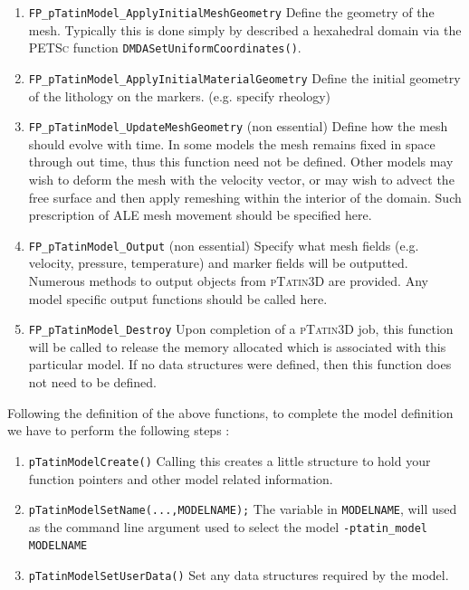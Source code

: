 \documentclass[paper=a4, fontsize=11pt,twoside]{scrartcl}
\newcommand{\ptat}{{{\textsc{pTatin3D}}}}
\newcommand{\PETSc}{{{\textsc{PETSc}}}}
\newcommand{\unix}[1]{\texttt{\footnotesize #1}}
\begin{document}
{{\begin{enumerate}
	\item \unix{FP\_pTatinModel\_ApplyInitialMeshGeometry}
	Define the geometry of the mesh. Typically this is done simply by described a hexahedral domain via the {\PETSc} function \unix{DMDASetUniformCoordinates()}.

	\item \unix{FP\_pTatinModel\_ApplyInitialMaterialGeometry}
	Define the initial geometry of the lithology on the markers. (e.g. specify rheology)

	\item \unix{FP\_pTatinModel\_UpdateMeshGeometry} (non essential)
	Define how the mesh should evolve with time. In some models the mesh remains fixed in space through out time, thus this function need not be defined. Other models may wish to deform the mesh with the velocity vector, or may wish to advect the free surface and then apply remeshing within the interior of the domain. Such prescription of ALE mesh movement should be specified here.

	\item \unix{FP\_pTatinModel\_Output} (non essential)
	Specify what mesh fields (e.g. velocity, pressure, temperature) and marker fields will be outputted. Numerous
	methods to output objects from {\ptat} are provided. Any model specific output functions should be called here.

	\item \unix{FP\_pTatinModel\_Destroy} 
	Upon completion of a {\ptat} job, this function will be called to release the memory allocated which is associated 
	with this particular model. If no data structures were defined, then this function does not need to be defined.
\end{enumerate}

Following the definition of the above functions, to complete the model definition we have to perform the following steps :
\begin{enumerate}
	\item \unix{pTatinModelCreate()}
Calling this creates a little structure to hold your function pointers and other model related information.

	\item \unix{pTatinModelSetName(...,MODELNAME);}
The variable in \unix{MODELNAME}, will used as the command line argument used to select the model
	\unix{-ptatin\_model MODELNAME}

	\item \unix{pTatinModelSetUserData()}
Set any data structures required by the model.


\end{enumerate}}}
\end{document}
